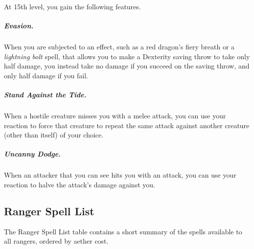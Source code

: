 At 15th level, you gain the following features.

\subparagraph*{Evasion.} When you are subjected to an effect, such as a red dragon's fiery breath or a \textit{lightning bolt} spell, that allows you to make a Dexterity saving throw to take only half damage, you instead take no damage if you succeed on the saving throw, and only half damage if you fail.

\subparagraph*{Stand Against the Tide.} When a hostile creature misses you with a melee attack, you can use your reaction to force that creature to repeat the same attack against another creature (other than itself) of your choice.

\subparagraph*{Uncanny Dodge.} When an attacker that you can see hits you with an attack, you can use your reaction to halve the attack's damage against you.

\subsection{Ranger Spell List}
The Ranger Spell List table contains a short summary of the spells available to all rangers, ordered by aether cost.

